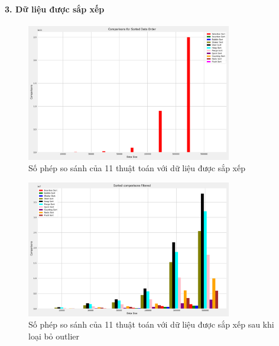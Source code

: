 \paragraph{3. Dữ liệu được sắp xếp}
\begin{figure}[H]
    \centering
    \includegraphics[width=0.8\textwidth]{img/results/sorted_comparisons.png}
    \caption{Số phép so sánh của 11 thuật toán với dữ liệu được sắp xếp}
\end{figure}

\begin{figure}[H]
    \centering
    \includegraphics[width=0.8\textwidth]{img/results/sorted_comparisons_filtered.png}
    \caption{Số phép so sánh của 11 thuật toán với dữ liệu được sắp xếp sau khi loại bỏ outlier}
\end{figure}




